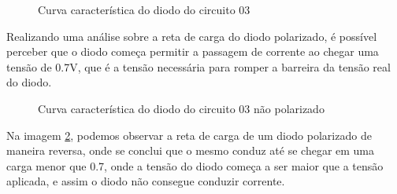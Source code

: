 \begin{figure}[H]
    \centering
    \caption{Curva característica do diodo do circuito 03}
    \vspace{-0.3cm}
    \label{fig:curva_diodo_polarizado}
\end{figure}

Realizando uma análise sobre a reta de carga do diodo polarizado, é possível perceber que o diodo começa permitir a passagem de corrente ao chegar uma tensão de 0.7V, que é a tensão necessária para romper a barreira da tensão real do diodo.

\begin{figure}[H]
    \centering
    \caption{Curva característica do diodo do circuito 03 não polarizado}
    \vspace{-0.3cm}
    \label{fig:curva_diodo_nao_polarizado}
\end{figure}

Na imagem \ref{fig:curva_diodo_nao_polarizado}, podemos observar a reta de carga de um diodo polarizado de maneira reversa, onde se conclui que o mesmo conduz até se chegar em uma carga menor que 0.7, onde a tensão do diodo começa a ser maior que a tensão aplicada, e assim o diodo não consegue conduzir corrente.

